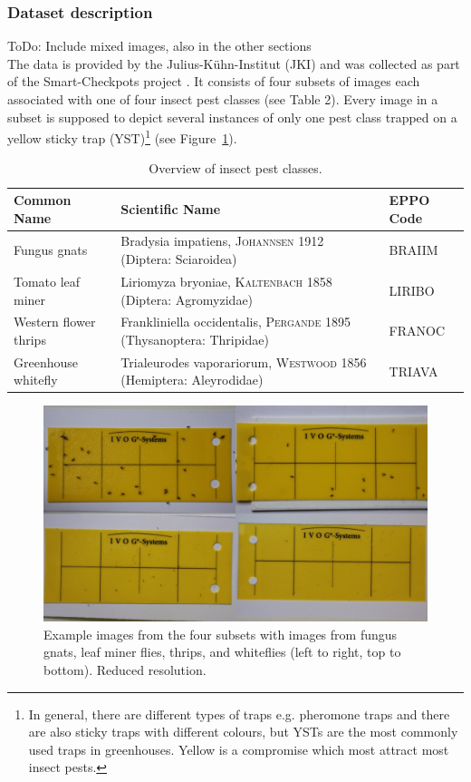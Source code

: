 \documentclass[12pt,a4paper]{article}
\begin{document}
\subsubsection{Dataset description}
\label{sec:data_description}
{\color{red} ToDo: Include mixed images, also in the other sections}\\
The data is provided by the Julius-Kühn-Institut (JKI) and was collected as part of the Smart-Checkpots project \cite{raaz_smart_2023}. It consists of four subsets of images each associated with one of four insect pest classes (see Table 2). Every image in a subset is supposed to depict several instances of only one pest class  trapped on a yellow sticky trap (YST)\footnote{In general, there are different types of traps e.g. pheromone traps and there are also sticky traps with different colours, but YSTs are the most commonly used traps in greenhouses. Yellow is a compromise which most attract most insect pests.} (see Figure~\ref{fig:example_YSTs}). 

\begin{table}[h!]
\centering
\begin{tabular}{|l|p{6cm}|l|}
\hline
\textbf{Common Name} & \textbf{Scientific Name} & \textbf{EPPO Code} \\ \hline
Fungus gnats & Bradysia impatiens, \textsc{Johannsen} 1912 (Diptera: Sciaroidea) & BRAIIM \\ \hline
Tomato leaf miner & Liriomyza bryoniae, \textsc{Kaltenbach} 1858 (Diptera: Agromyzidae) & LIRIBO \\ \hline
Western flower thrips & Frankliniella occidentalis, \textsc{Pergande} 1895 (Thysanoptera: Thripidae) & FRANOC \\ \hline
Greenhouse whitefly & Trialeurodes vaporariorum, \textsc{Westwood} 1856 (Hemiptera: Aleyrodidae) & TRIAVA \\ \hline
\end{tabular}
\caption{Overview of insect pest classes.}
\label{tab:insect_classes}
\end{table}

\begin{figure}[H]  %
    \centering
    \includegraphics[width=1.0\textwidth]{images/figure1.jpg}  %
    \caption{Example images from the four subsets with images from fungus gnats, leaf miner flies, thrips, and whiteflies (left to right, top to bottom). Reduced resolution.}
    \label{fig:example_YSTs}
\end{figure}
\end{document}
